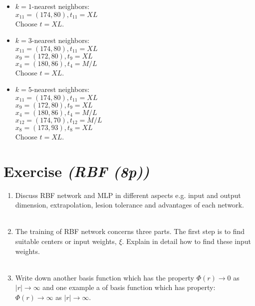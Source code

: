 \documentclass{article}
\newcommand\then{\rightarrow}
\begin{document}
\begin{itemize}
    \item
        $k=1$-nearest neighbors:\\
        $x_{11}=(174,80), t_{11}=XL$\\
        Choose $t = XL$.\\
    \item
        $k=3$-nearest neighbors:\\
        $x_{11}=(174,80), t_{11}=XL$\\
        $x_9=(172,80), t_9=XL$\\
        $x_4=(180,86), t_4=M/L$\\
        Choose $t = XL$.\\
    \item
        $k=5$-nearest neighbors:\\
        $x_{11}=(174,80), t_{11}=XL$\\
        $x_9=(172,80), t_9=XL$\\
        $x_4=(180,86), t_4=M/L$\\
        $x_{12}=(174,70), t_{12}=M/L$\\
        $x_8=(173,93),t_8=XL$\\
        Choose $t = XL$.\\
\end{itemize}

\section{Exercise \textit{(RBF (8p))}}
\begin{enumerate}
    \item Discuss RBF network and MLP in different aspects e.g. input and output
        dimension, extrapolation, lesion tolerance and advantages of each
        network.\\
        \\
    \item The training of RBF network concerns three parts. The first step is to
        find suitable centers or input weights, $\xi$. Explain in detail how to
        find these input weights.\\
        \\
    \item  Write down another basis function which has the property $\Phi(r)
        \then 0$ as $|r| \then \infty$ and one example a of basis function
        which has property: $\Phi(r) \then \infty$ as $|r| \then
        \infty$.\\
        \\
\end{enumerate}
\end{document}
